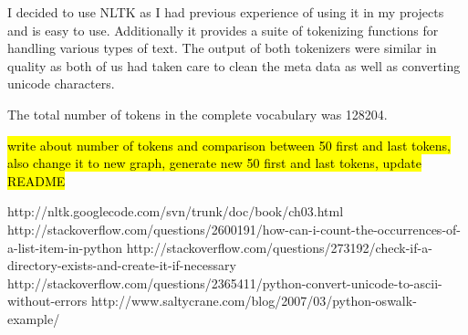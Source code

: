 \documentclass[11pt]{article} %
\begin{document}
I decided to use NLTK as I had previous experience of using it in my projects and is easy to use. Additionally it provides a suite of tokenizing functions for handling various types of text. The output of both tokenizers were similar in quality as both of us had taken care to clean the meta data as well as converting unicode characters.

The total number of tokens in the complete vocabulary was 128204. 

 \hl{write about number of tokens and comparison between 50 first and last tokens, also change it to new graph, generate new 50 first and last tokens, update README} \\ 












\begin{thebibliography}{99} %

\bibitem http://nltk.googlecode.com/svn/trunk/doc/book/ch03.html
\bibitem http://stackoverflow.com/questions/2600191/how-can-i-count-the-occurrences-of-a-list-item-in-python
\bibitem http://stackoverflow.com/questions/273192/check-if-a-directory-exists-and-create-it-if-necessary
\bibitem http://stackoverflow.com/questions/2365411/python-convert-unicode-to-ascii-without-errors
\bibitem http://www.saltycrane.com/blog/2007/03/python-oswalk-example/
 
\end{thebibliography}
\end{document}
